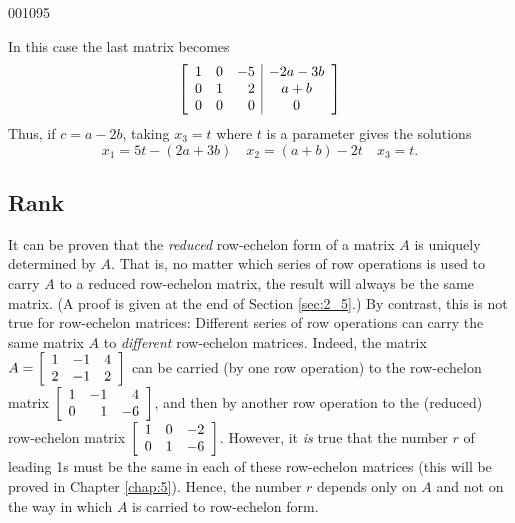 \begin{example}{}{001095}
\begin{solution}
\begin{quotation}
\end{quotation}

In this case the last matrix becomes
\begin{equation*}
\left[ \begin{array}{rrr|c}
1 &  0 & -5 & -2a - 3b \\
0 &  1 & 2 & a + b \\
0 &  0 & 0 & 0
\end{array} \right]
\end{equation*}
Thus, if $c = a - 2b$, taking $x_3 = t$ where $t$ is a parameter gives the solutions
\begin{equation*}
x_1 = 5t - (2a + 3b) \quad x_2 = (a + b) - 2t \quad x_3 = t.
\end{equation*}
\end{solution}
\end{example}

\subsection*{Rank}

It can be proven that the \textit{reduced} row-echelon form of a matrix $A$ is uniquely determined by $A$. That is, no matter which series of row operations is used to carry $A$ to a reduced row-echelon matrix, the result will always be the same matrix. (A proof is given at the end of Section \ref{sec:2_5}.) By contrast, this is not true for row-echelon matrices: Different series of row operations can carry the same matrix $A$ to \textit{different} row-echelon matrices. Indeed, the matrix $A = 
\left[ \begin{array}{rrr}
	1 & -1 & 4 \\
	2 & -1 & 2
\end{array} \right]$ can be carried (by one row operation) to the row-echelon matrix $
 \left[ \begin{array}{rrr}
	 1 & -1 & 4 \\
	 0 & 1 & -6
 \end{array} \right]$, and then by another row operation to the (reduced) row-echelon matrix $
\left[ \begin{array}{rrr}
	1 & 0 & -2 \\
	0 & 1 & -6
\end{array} \right]$. However, it \textit{is} true that the number $r$ of leading 1s must be the same in each of these row-echelon matrices (this will be proved in Chapter \ref{chap:5}). Hence, the number $r$ depends only on $A$ and not on the way in which $A$ is carried to row-echelon form.

